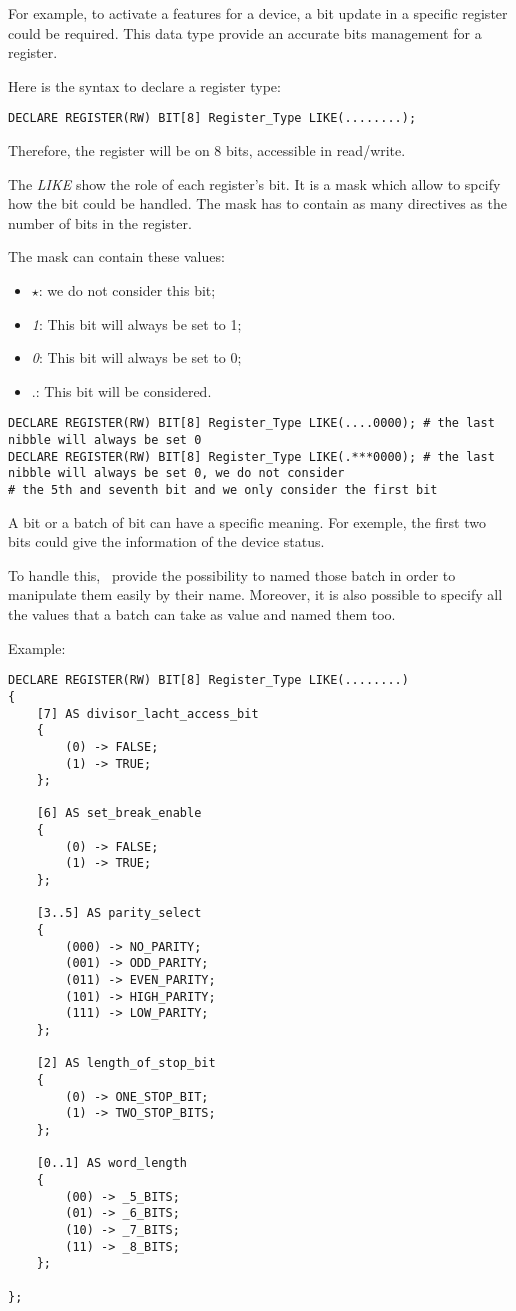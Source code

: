\documentclass[american]{rtxreport}
\begin{document}
For example, to activate a features for a device, a bit update in a specific
register could be required. This data type provide an accurate bits management
for a register.

Here is the syntax to declare a register type:
\begin{lstlisting}[caption=Declaration of a register on 1 byte]
DECLARE REGISTER(RW) BIT[8] Register_Type LIKE(........);
\end{lstlisting}

Therefore, the register will be on 8 bits, accessible in read/write.

The \emph{LIKE} show the role of each register's bit. It is a mask which allow
to spcify how the bit could be handled. The mask has to contain as many directives
as the number of bits in the register.

The mask can contain these values:
\begin{itemize}
	\item $\star$: we do not consider this bit;
	\item \emph{1}: This bit will always be set to 1;
	\item \emph{0}: This bit will always be set to 0;
	\item .: This bit will be considered.
\end{itemize}
\begin{lstlisting}[caption=Example of some masks]
DECLARE REGISTER(RW) BIT[8] Register_Type LIKE(....0000); # the last nibble will always be set 0
DECLARE REGISTER(RW) BIT[8] Register_Type LIKE(.***0000); # the last nibble will always be set 0, we do not consider
# the 5th and seventh bit and we only consider the first bit
\end{lstlisting}

A bit or a batch of bit can have a specific meaning. For exemple, the first two bits could
give the information of the device status.

To handle this, \rtx\ provide the possibility to named those batch in order to manipulate them
easily by their name. Moreover, it is also possible to specify all the values that a batch can take as value
and named them too.

Example:
\begin{lstlisting}[caption=Internal description of a register]
DECLARE REGISTER(RW) BIT[8] Register_Type LIKE(........)
{
    [7] AS divisor_lacht_access_bit
    {
        (0) -> FALSE;
        (1) -> TRUE;
    };

    [6] AS set_break_enable
    {
        (0) -> FALSE;
        (1) -> TRUE;
    };

    [3..5] AS parity_select
    {
        (000) -> NO_PARITY;
        (001) -> ODD_PARITY;
        (011) -> EVEN_PARITY;
        (101) -> HIGH_PARITY;
        (111) -> LOW_PARITY;
    };

    [2] AS length_of_stop_bit
    {
        (0) -> ONE_STOP_BIT;
        (1) -> TWO_STOP_BITS;
    };

    [0..1] AS word_length
    {
        (00) -> _5_BITS;
        (01) -> _6_BITS;
        (10) -> _7_BITS;
        (11) -> _8_BITS;
    };

};
\end{lstlisting}
\end{document}
